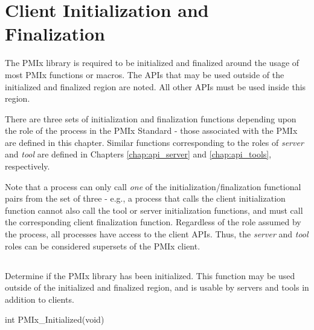\chapter{Client Initialization and Finalization}
\label{chap:api_init}

The \ac{PMIx} library is required to be initialized and finalized around the usage of most \ac{PMIx} functions or macros.
The \acp{API} that may be used outside of the initialized and finalized region are noted.
All other \acp{API} must be used inside this region.

There are three sets of initialization and finalization functions depending upon the role of the process in the \ac{PMIx} Standard - those associated with the \ac{PMIx}  are defined in this chapter. Similar functions corresponding to the roles of \emph{server} and \emph{tool} are defined in Chapters \ref{chap:api_server} and \ref{chap:api_tools}, respectively.

Note that a process can only call \textit{one} of the initialization/finalization functional pairs from the set of three - e.g., a process that calls the client initialization function cannot also call the tool or server initialization functions, and must call the corresponding client finalization function. Regardless of the role assumed by the process, all processes have access to the client \acp{API}. Thus, the \emph{server} and \emph{tool} roles can be considered supersets of the \ac{PMIx} client.

\section{}

\summary

Determine if the \ac{PMIx} library has been initialized. This function may be used outside of the initialized and finalized region, and is usable by servers and tools in addition to clients.

\format

\cspecificstart
\begin{codepar}
int PMIx_Initialized(void)
\end{codepar}
\cspecificend

